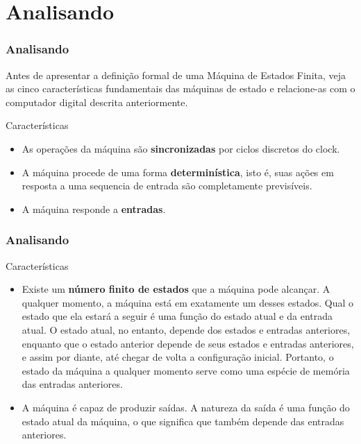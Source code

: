 \documentclass{beamer}
\begin{document}
\section{Analisando}
  \begin{frame}
   \frametitle{Analisando}
	Antes de apresentar a definição formal de uma Máquina de Estados Finita, veja as cinco características fundamentais das máquinas de 
	estado e relacione-as com o computador digital descrita anteriormente.\pause
	
      \begin{block}{Características}
	\begin{itemize}
	  \item As operações da máquina são \textbf{sincronizadas} por ciclos discretos do clock.
	  \item A máquina procede de uma forma \textbf{determinística}, isto é, suas ações em resposta a uma sequencia de entrada são completamente 
		previsíveis.
	  \item A máquina responde a \textbf{entradas}.
	\end{itemize}
      \end{block}
  \end{frame}

  \begin{frame}
   \frametitle{Analisando}
       \begin{block}{Características}
	\begin{itemize}
	\item Existe um \textbf{número finito de estados} que a máquina pode alcançar. A qualquer momento, a máquina está em exatamente um desses 
	      estados. Qual o estado que ela estará a seguir é uma função do estado atual e da entrada atual. O estado atual, no entanto, depende 
	      dos estados e entradas anteriores, enquanto que o estado anterior depende de seus estados e entradas anteriores, e assim por diante, 
	      até chegar de volta a configuração inicial. Portanto, o estado da máquina a qualquer momento serve como uma espécie de memória das 
	      entradas anteriores.\pause
	 \item A máquina é capaz de produzir saídas. A natureza da saída é uma função do estado atual da máquina, o que significa que também depende 
	      das entradas anteriores. 
	\end{itemize}
      \end{block}
  \end{frame}

\end{document}
